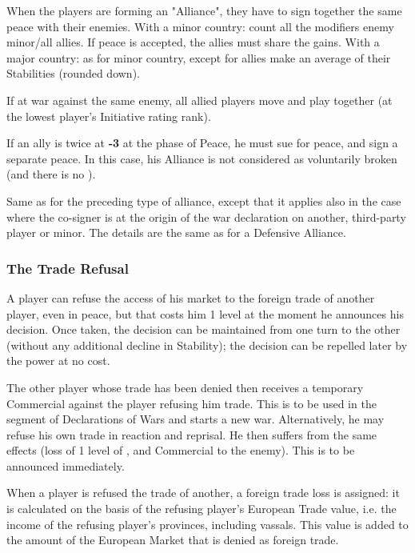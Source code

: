 \bparag When the players are forming an "Alliance", they have to sign together
the same peace with their enemies. With a minor country: count all the
modifiers enemy minor/all allies. If peace is accepted, the allies must share
the gains. With a major country: as for minor country, except for allies make
an average of their Stabilities (rounded down).

\bparag If at war against the same enemy, all allied players move and play
together (at the lowest player's Initiative rating rank).

\bparag If an ally is twice at {\bf -3} \STAB at the phase of Peace, he must
sue for peace, and sign a separate peace. In this case, his Alliance is not
considered as voluntarily broken (and there is no \CB).

\label{chDiplo:Alliance:Offensive Alliance}
Same as for the preceding type of alliance, except that it applies also in the
case where the co-signer is at the origin of the war declaration on another,
third-party player or minor.
\bparag The details are the same as for a Defensive Alliance.


\subsubsection{The Trade Refusal}
\aparag A player can refuse the access of his market to the foreign trade of
another player, even in peace, but that costs him 1 \STAB level at the moment
he announces his decision. Once taken, the decision can be maintained from one
turn to the other (without any additional decline in Stability); the decision
can be repelled later by the power at no cost.

\bparag The other player whose trade has been denied then receives a temporary
Commercial \CB against the player refusing him trade. This \CB is to be used
in the segment of Declarations of Wars and starts a new war.
\bparag Alternatively, he may refuse his own trade in reaction and
reprisal. He then suffers from the same effects (loss of 1 level of \STAB, and
Commercial \CB to the enemy). This is to be announced immediately.


\bparag When a player is refused the trade of another, a foreign trade loss is
assigned: it is calculated on the basis of the refusing player's European
Trade value, i.e. the income of the refusing player's provinces, including
vassals. This value is added to the amount of the European Market that is
denied as foreign trade.

